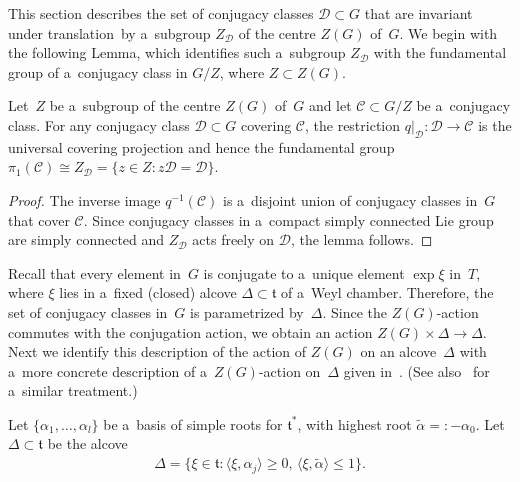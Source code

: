 This section describes the set of conjugacy classes $\mathcal{D}\subset G$ that are invariant under translation~by
a~subgroup $Z_\mathcal{D}$ of the centre $Z(G)$ of~$G$.
We begin with the following Lemma, which identif\/ies such a~subgroup $Z_\mathcal{D}$ with the fundamental group of
a~conjugacy class in $G/Z$, where $Z\subset Z(G)$.

\begin{Lemma}
\label{lemma:pi1ofC}
Let~$Z$ be a~subgroup of the centre $Z(G)$ of~$G$ and let $\mathcal{C} \subset G/Z$ be a~conjugacy class.
For any conjugacy class $\mathcal{D}\subset G$ covering $\mathcal{C}$, the restriction $q|_{\mathcal{D}}: \mathcal{D}
\to \mathcal{C}$ is the universal covering projection and hence the fundamental group $\pi_1(\mathcal{C}) \cong
Z_\mathcal{D}=\{z \in Z \colon z\mathcal{D} = \mathcal{D} \}$.
\end{Lemma}

\begin{proof}
The inverse image $q^{-1}(\mathcal{C})$ is a~disjoint union of conjugacy classes in~$G$ that cover $\mathcal{C}$.
Since conjugacy classes in a~compact simply connected Lie group are simply connected and $Z_\mathcal{D}$ acts freely on
$\mathcal{D}$, the lemma follows.
\end{proof}

Recall that every element in~$G$ is conjugate to a~unique element $\exp \xi$ in~$T$, where $\xi$ lies in a~f\/ixed (closed)
alcove $\Delta \subset \mathfrak{t}$ of a~Weyl chamber.
Therefore, the set of conjugacy classes in~$G$ is parametrized by~$\Delta$.
Since the $Z(G)$-action commutes with the conjugation action, we obtain an action $Z(G)\times \Delta \to \Delta$.
Next we identify this description of the action of $Z(G)$ on an alcove~$\Delta$ with a~more concrete description of
a~$Z(G)$-action on~$\Delta$ given in~\cite[Section~4.1]{TL}.
(See also~\cite[Section~3.1]{BFM} for a~similar treatment.)

Let $\{\alpha_1, \ldots, \alpha_l \}$ be a~basis of simple roots for $\mathfrak{t}^*$, with highest root
$\tilde{\alpha}=:-\alpha_0$.
Let $\Delta \subset \mathfrak{t}$ be the alcove
\begin{gather*}
\Delta = \{\xi \in \mathfrak{t} \colon \langle \xi,\alpha_j\rangle \geq 0, \, \langle \xi, \tilde{\alpha}\rangle \leq 1
\}.
\end{gather*}

